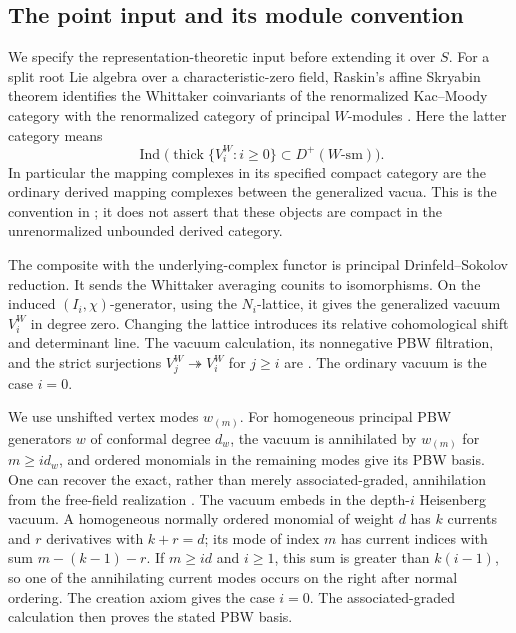 \subsection{The point input and its module convention}

We specify the representation-theoretic input before extending it over
\(S\).  For a split root Lie algebra over a characteristic-zero field,
Raskin's affine Skryabin theorem identifies the Whittaker coinvariants
of the renormalized Kac--Moody category with the renormalized category
of principal \(W\)-modules \cite[Theorem~5.1.1]{RaskinW}.
Here the latter category means
\[
 \operatorname{Ind}\bigl(\operatorname{thick}
       \{V_i^W:i\geq0\}\subset D^+(W\text{-}\mathrm{sm})\bigr).
\]
In particular the mapping complexes in its specified compact category
are the ordinary derived mapping complexes between the generalized
vacua.  This is the convention in \cite[Section~5.1 and the proof of
Theorem~5.1.1]{RaskinW}; it does not assert that these objects are
compact in the unrenormalized unbounded derived category.

The composite with the underlying-complex functor is principal
Drinfeld--Sokolov reduction.  It sends the Whittaker averaging
counits to isomorphisms.  On the induced \((I_i,\chi)\)-generator,
using the \(N_i\)-lattice, it gives the generalized vacuum \(V_i^W\)
in degree zero.  Changing the lattice introduces its relative
cohomological shift and determinant line.  The vacuum calculation,
its nonnegative PBW filtration, and the strict surjections
\(V_j^W\twoheadrightarrow V_i^W\) for \(j\geq i\) are
\cite[Theorems~4.2.1, 4.5.1, and 4.6.1]{RaskinW}.
The ordinary vacuum is the case \(i=0\).

We use unshifted vertex modes \(w_{(m)}\).  For homogeneous principal
PBW generators \(w\) of conformal degree \(d_w\), the vacuum is
annihilated by \(w_{(m)}\) for \(m\geq i d_w\), and ordered
monomials in the remaining modes give its PBW basis.  One can recover
the exact, rather than merely associated-graded, annihilation from
the free-field realization \cite[Theorem~6.1.1]{RaskinW}.  The vacuum
embeds in the depth-\(i\) Heisenberg vacuum.  A homogeneous
normally ordered monomial of weight \(d\) has \(k\) currents and
\(r\) derivatives with \(k+r=d\); its mode of index \(m\) has
current indices with sum \(m-(k-1)-r\).  If \(m\geq id\) and
\(i\geq1\), this sum is greater than \(k(i-1)\), so one of the
annihilating current modes occurs on the right after normal ordering.
The creation axiom gives the case \(i=0\).  The associated-graded
calculation then proves the stated PBW basis.


